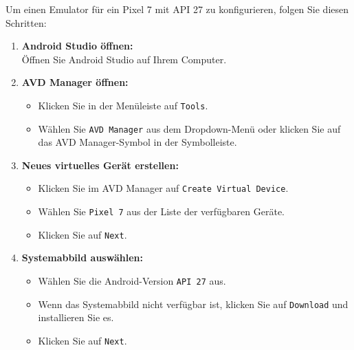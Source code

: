 \documentclass[conference,a4paper,flushend]{cs-techrep}
\begin{document}
Um einen Emulator für ein Pixel 7 mit API 27 zu konfigurieren, folgen Sie diesen Schritten:
\vspace{0.5em}
\begin{enumerate}
    \item \textbf{Android Studio öffnen:} \\
    Öffnen Sie Android Studio auf Ihrem Computer.
    
    \item \textbf{AVD Manager öffnen:}
    \begin{itemize}
        \item Klicken Sie in der Menüleiste auf \texttt{Tools}.
        \vspace{0.5em}
        \item Wählen Sie \texttt{AVD Manager} aus dem Dropdown-Menü oder klicken Sie auf das AVD Manager-Symbol in der Symbolleiste.
        \vspace{0.5em}
    \end{itemize}
    \vspace{0.5em}
    \item \textbf{Neues virtuelles Gerät erstellen:}
    \begin{itemize}
        \item Klicken Sie im AVD Manager auf \texttt{Create Virtual Device}.
        \vspace{0.5em}
        \item Wählen Sie \texttt{Pixel 7} aus der Liste der verfügbaren Geräte.
        \vspace{0.5em}
        \item Klicken Sie auf \texttt{Next}.
        \vspace{0.5em}
    \end{itemize}
    \vspace{0.5em}
    \item \textbf{Systemabbild auswählen:}
    \begin{itemize}
        \item Wählen Sie die Android-Version \texttt{API 27} aus.
        \vspace{0.5em}
        \item Wenn das Systemabbild nicht verfügbar ist, klicken Sie auf 
        \vspace{0.5em}
        \texttt{Download} und installieren Sie es.
        \vspace{0.5em}
        \item Klicken Sie auf \texttt{Next}.
        \vspace{0.5em}

\end{itemize}
\end{enumerate}
\end{document}
